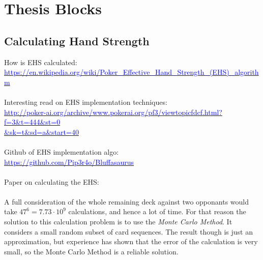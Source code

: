 



\newpage

\chapter{Thesis Blocks}
\section{Calculating Hand Strength}
How is EHS calculated: \\
\href{https://en.wikipedia.org/wiki/Poker\_Effective\_Hand\_Strength\_(EHS)\_algorithm}{\textcolor{blue}{https://en.wikipedia.org/wiki/Poker\_Effective\_Hand\_Strength\_(EHS)\_algorithm}} \\\\
Interesting read on EHS implementation techniques:\\
\href{http://poker-ai.org/archive/www.pokerai.org/pf3/viewtopicfdcf.html?f=3\&t=444\&st=0\&sk=t\&sd=a\&start=40}{\textcolor{blue}{http://poker-ai.org/archive/www.pokerai.org/pf3/viewtopicfdcf.html?f=3\&t=444\&st=0 \\ \&sk=t\&sd=a\&start=40}} \\\\
Github of EHS implementation algo:\\
\href{https://github.com/Pip3r4o/Bluffasaurus}{\textcolor{blue}{https://github.com/Pip3r4o/Bluffasaurus}} \\\\
Paper on calculating the EHS: \cite{ehs_calc} \\\\

A full consideration of the whole remaining deck against two opponants would take $47^6 = 7.73 \cdot 10^9$ calculations, and hence a lot of time. For that reason the solution to this calculation problem is to use the \textit{Monte Carlo Method}. It considers a small random subset of card sequences. The result though is just an approximation, but experience has shown that the error of the calculation is very small, so the Monte Carlo Method is a reliable solution. \cite{ehs_calc}\\\\

